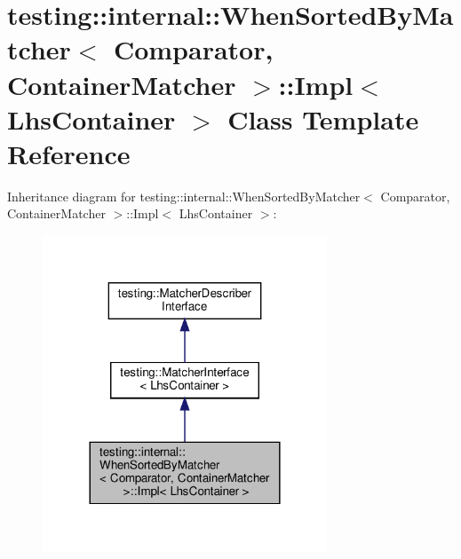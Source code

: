 \hypertarget{classtesting_1_1internal_1_1_when_sorted_by_matcher_1_1_impl}{}\section{testing\+:\+:internal\+:\+:When\+Sorted\+By\+Matcher$<$ Comparator, Container\+Matcher $>$\+:\+:Impl$<$ Lhs\+Container $>$ Class Template Reference}
\label{classtesting_1_1internal_1_1_when_sorted_by_matcher_1_1_impl}


Inheritance diagram for testing\+:\+:internal\+:\+:When\+Sorted\+By\+Matcher$<$ Comparator, Container\+Matcher $>$\+:\+:Impl$<$ Lhs\+Container $>$\+:
\nopagebreak
\begin{figure}[H]
\begin{center}
\leavevmode
\includegraphics[width=240pt]{classtesting_1_1internal_1_1_when_sorted_by_matcher_1_1_impl__inherit__graph}
\end{center}
\end{figure}


